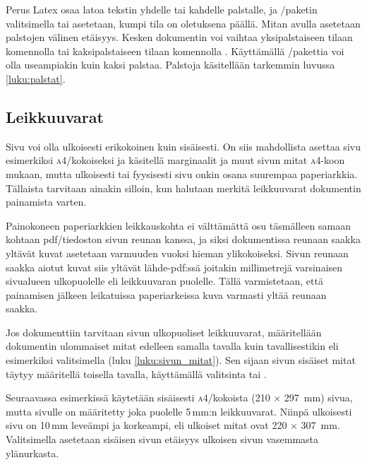 Perus%
 Latex osaa latoa
tekstin yhdelle tai kahdelle palstalle, ja \-/paketin
valitsimella  tai  asetetaan,
kumpi tila on oletuksena päällä. Mitan  avulla
asetetaan palstojen välinen etäisyys. Kesken dokumentin voi vaihtaa
yksipalstaiseen tilaan komennolla  tai
kaksipalstaiseen tilaan komennolla .
Käyttämällä \-/pakettia voi olla
useampiakin kuin kaksi palstaa. Palstoja käsitellään tarkemmin luvussa
\ref{luku:palstat}.

\subsection{Leikkuuvarat}

Sivu voi olla ulkoisesti erikokoinen kuin sisäisesti. On siis
mahdollista asettaa sivu esimerkiksi \textsc{a4}\-/kokoiseksi ja
käsitellä marginaalit ja muut sivun mitat \textsc{a4}-koon mukaan, mutta
ulkoisesti tai fyysisesti sivu onkin osana suurempaa paperi\-arkkia.
Tällaista tarvitaan ainakin silloin, kun halutaan merkitä leikkuuvarat
dokumentin painamista varten.

Painokoneen paperi\-arkkien leikkauskohta ei välttämättä osu täsmälleen
samaan kohtaan pdf\-/tiedoston sivun reunan kanssa, ja siksi
dokumentissa reunaan saakka yltävät kuvat asetetaan varmuuden vuoksi
hieman ylikokoiseksi. Sivun reunaan saakka aiotut kuvat siis yltävät
lähde-pdf:ssä joitakin millimetrejä varsinaisen sivu\-alueen
ulkopuolelle eli leikkuuvaran puolelle. Tällä varmistetaan, että
painamisen jälkeen leikatuissa paperi\-arkeissa kuva varmasti yltää
reunaan saakka.

Jos dokumenttiin tarvitaan sivun ulkopuoliset leikkuuvarat, määritellään
dokumentin ulommaiset mitat edelleen samalla tavalla kuin
tavallisestikin eli esimerkiksi valitsimella  (luku
\ref{luku:sivun_mitat}). Sen sijaan sivun sisäiset mitat täytyy
määritellä toisella tavalla, käyttämällä valitsinta  tai
.

Seuraavassa esimerkissä käytetään sisäisesti \textsc{a4}\-/kokoista (210
× 297~mm) sivua, mutta sivulle on määritetty joka puolelle 5\,mm:n
leikkuuvarat. Niinpä ulkoisesti sivu on 10\,mm leveämpi ja korkeampi,
eli ulkoiset mitat ovat 220 × 307~mm. Valitsimella
 asetetaan sisäisen sivun etäisyys ulkoisen sivun
vasemmasta ylänurkasta.

